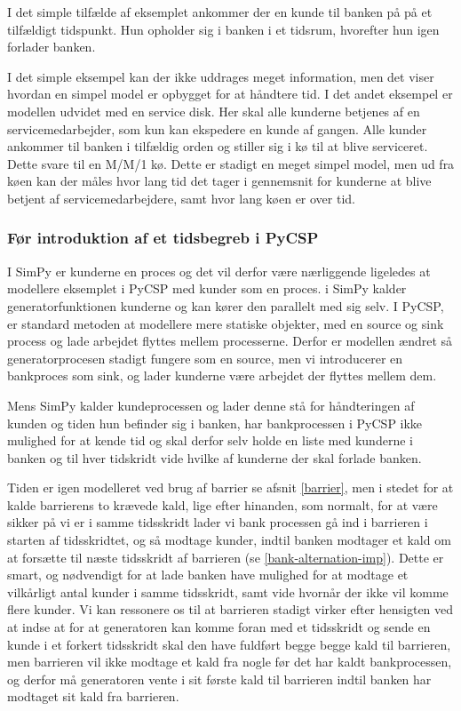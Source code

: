 I det simple tilfælde af eksemplet ankommer der en kunde til banken på på et 
tilfældigt tidspunkt. Hun opholder sig i banken i et tidsrum, hvorefter hun 
igen forlader banken.

I det simple eksempel kan der ikke uddrages meget information, men det viser hvordan en simpel model er opbygget for at håndtere tid.
I det andet eksempel er modellen 
udvidet med en service disk. Her skal alle kunderne betjenes af en 
servicemedarbejder, som kun kan ekspedere en kunde af gangen. Alle kunder ankommer til banken i tilfældig orden og 
stiller sig i kø til at blive serviceret. Dette  svare til en M/M/1 kø. Dette er stadigt en meget simpel model, men ud fra køen kan der måles hvor lang tid det tager i gennemsnit for kunderne at blive betjent af servicemedarbejdere, samt hvor lang køen er over tid. 

\subsubsection{Før introduktion af et tidsbegreb i PyCSP}
I SimPy er kunderne en proces og det vil derfor være nærliggende ligeledes at 
modellere eksemplet i PyCSP med kunder som en proces. i SimPy kalder 
generatorfunktionen kunderne og kan kører den parallelt med sig selv. 
I PyCSP, er standard metoden at modellere mere statiske objekter, med en source og sink 
process og lade arbejdet flyttes mellem processerne. Derfor er modellen ændret 
så  generatorprocesen stadigt fungere som en source, men vi introducerer en 
bankproces som sink, og lader kunderne være arbejdet der flyttes mellem dem. 

Mens SimPy  kalder kundeprocessen og lader denne stå for håndteringen af 
kunden og tiden hun befinder sig i banken, har bankprocessen i PyCSP ikke 
mulighed for at kende tid og skal derfor selv holde en liste med kunderne 
i banken og  til hver tidskridt vide hvilke af kunderne der skal forlade 
banken. 

Tiden er igen modelleret ved brug af barrier se afsnit \vref{barrier}, men 
i stedet for  at kalde barrierens to krævede kald, lige efter hinanden, som 
normalt, for at være sikker på vi er i samme tidsskridt lader vi bank
processen gå ind i barrieren i starten af tidsskridtet, og så modtage kunder, 
indtil banken modtager et kald om at forsætte til næste tidsskridt af 
barrieren (se \autoref{bank-alternation-imp}). Dette er smart, og nødvendigt for at lade banken have mulighed for at modtage 
et vilkårligt antal kunder i samme tidsskridt, samt vide hvornår der ikke vil  
komme flere kunder. Vi kan ressonere os til at barrieren stadigt virker efter 
hensigten ved at indse at for at generatoren kan komme foran med et tidsskridt og sende en 
kunde i et forkert tidsskridt skal den have fuldført begge begge kald til barrieren, men 
barrieren vil ikke modtage et kald fra nogle før det har kaldt bankprocessen, 
og derfor må generatoren vente i sit første kald til barrieren indtil banken har 
modtaget sit kald fra barrieren. 

